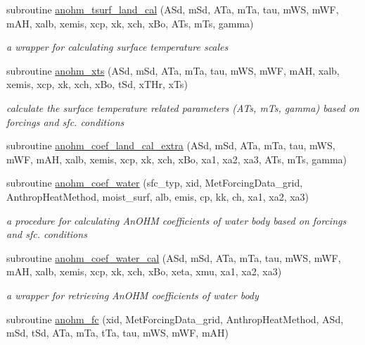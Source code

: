 \begin{DoxyCompactItemize}
subroutine \hyperlink{namespaceanohm__module_a3f1a576bdde691f251c98f56d28b6c5e}{anohm\+\_\+tsurf\+\_\+land\+\_\+cal} (A\+Sd, m\+Sd, A\+Ta, m\+Ta, tau, m\+WS, m\+WF, m\+AH, xalb, xemis, xcp, xk, xch, x\+Bo, A\+Ts, m\+Ts, gamma)
\begin{DoxyCompactList}\small\item\em a wrapper for calculating surface temperature scales \end{DoxyCompactList}\item 
subroutine \hyperlink{namespaceanohm__module_a54c27af87baa1736fd40590bed6c081e}{anohm\+\_\+xts} (A\+Sd, m\+Sd, A\+Ta, m\+Ta, tau, m\+WS, m\+WF, m\+AH, xalb, xemis, xcp, xk, xch, x\+Bo, t\+Sd, x\+T\+Hr, x\+Ts)
\begin{DoxyCompactList}\small\item\em calculate the surface temperature related parameters (A\+Ts, m\+Ts, gamma) based on forcings and sfc. conditions \end{DoxyCompactList}\item 
subroutine \hyperlink{namespaceanohm__module_ab96821e3f733aae01d895aa8830085b7}{anohm\+\_\+coef\+\_\+land\+\_\+cal\+\_\+extra} (A\+Sd, m\+Sd, A\+Ta, m\+Ta, tau, m\+WS, m\+WF, m\+AH, xalb, xemis, xcp, xk, xch, x\+Bo, xa1, xa2, xa3, A\+Ts, m\+Ts, gamma)
\item 
subroutine \hyperlink{namespaceanohm__module_a5b0b99ebb9db9ec50d904cc7a9802779}{anohm\+\_\+coef\+\_\+water} (sfc\+\_\+typ, xid, Met\+Forcing\+Data\+\_\+grid, Anthrop\+Heat\+Method, moist\+\_\+surf, alb, emis, cp, kk, ch, xa1, xa2, xa3)
\begin{DoxyCompactList}\small\item\em a procedure for calculating An\+O\+HM coefficients of water body based on forcings and sfc. conditions \end{DoxyCompactList}\item 
subroutine \hyperlink{namespaceanohm__module_aeb16132909e9aae5549d9ce6adcf389f}{anohm\+\_\+coef\+\_\+water\+\_\+cal} (A\+Sd, m\+Sd, A\+Ta, m\+Ta, tau, m\+WS, m\+WF, m\+AH, xalb, xemis, xcp, xk, xch, x\+Bo, xeta, xmu, xa1, xa2, xa3)
\begin{DoxyCompactList}\small\item\em a wrapper for retrieving An\+O\+HM coefficients of water body \end{DoxyCompactList}\item 
subroutine \hyperlink{namespaceanohm__module_aeb3eededd40f7c2bb12213c747c93513}{anohm\+\_\+fc} (xid, Met\+Forcing\+Data\+\_\+grid, Anthrop\+Heat\+Method, A\+Sd, m\+Sd, t\+Sd, A\+Ta, m\+Ta, t\+Ta, tau, m\+WS, m\+WF, m\+AH)

\end{DoxyCompactItemize}

